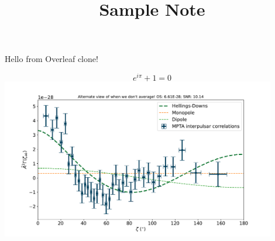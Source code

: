 \documentclass{article}
\title{Sample Note}
\begin{document}
\maketitle
Hello from Overleaf clone!

\[
e^{i\pi} + 1 = 0
\]
\includegraphics[width=12cm, height=7cm]{OS_HD_rn_noise84-2.pdf}
\end{document}
